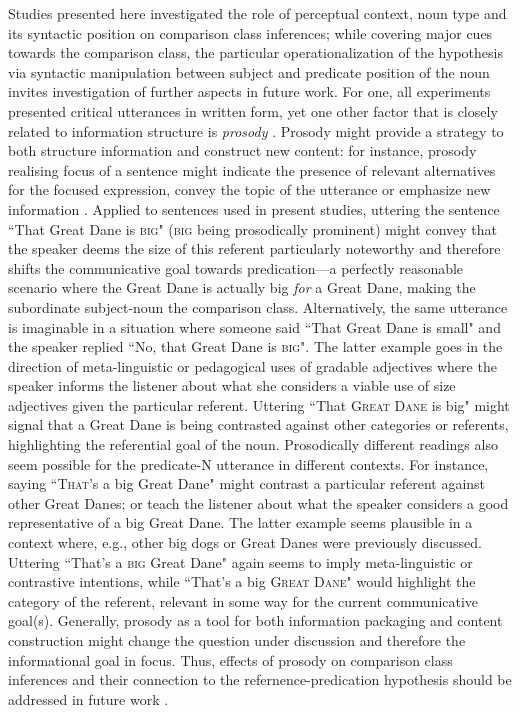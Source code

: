Studies presented here investigated the role of perceptual context, noun type and its syntactic position on comparison class inferences; while covering major cues towards the comparison class, the particular operationalization of the hypothesis via syntactic manipulation between subject and predicate position of the noun invites investigation of further aspects in future work. For one, all experiments presented critical utterances in written form, yet one other factor that is closely related to information structure is \emph{prosody} \parencite{krifka2008basic}. Prosody might provide a strategy to both structure information and construct new content: for instance, prosody realising focus of a sentence might indicate the presence of relevant alternatives for the focused expression, convey the topic of the utterance or emphasize new information \parencite{krifka2008basic, selkirk1995sentence}. 
Applied to sentences used in present studies, uttering the sentence ``That Great Dane is \textsc{big}" (\textsc{big} being prosodically prominent) might convey that the speaker deems the size of this referent particularly noteworthy and therefore shifts the communicative goal towards predication---a perfectly reasonable scenario where the Great Dane is actually big \emph{for} a Great Dane, making the subordinate subject-noun the comparison class.  Alternatively, the same utterance is imaginable in a situation where someone said ``That Great Dane is small" and the speaker replied ``No, that Great Dane is \textsc{big}". The latter example goes in the direction of meta-linguistic or pedagogical uses of gradable adjectives where the speaker informs the listener about what she considers a viable use of size adjectives given the particular referent. Uttering ``That \textsc{Great Dane} is big" might signal that a Great Dane is being contrasted against other categories or referents, highlighting the referential goal of the noun.
Prosodically different readings also seem possible for the predicate-N utterance in different contexts. For instance, saying ``\textsc{That}'s a big Great Dane" might contrast a particular referent against other Great Danes; or teach the listener about what the speaker considers a good representative of a big Great Dane. The latter example seems plausible in a context where, e.g., other big dogs or Great Danes were previously discussed. Uttering ``That's a \textsc{big} Great Dane" again seems to imply meta-linguistic or contrastive intentions, while ``That's a big \textsc{Great Dane}" would highlight the category of the referent, relevant in some way for the current communicative goal(s). 
Generally, prosody as a tool for both information packaging and content construction might change the question under discussion and therefore the informational goal in focus. Thus, effects of prosody on comparison class inferences and their connection to the refernence-predication hypothesis should be addressed in future work \parencite[cf.][]{krifka2008basic}. 

